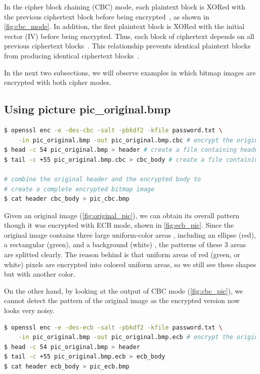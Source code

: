 In the cipher block chaining (CBC) mode, each plaintext block is XORed with
the previous ciphertext block before being encrypted~\cite{cipher_mode_wiki},
as shown in \autoref{fig:cbc_mode}.
In addition, the first plaintext block is XORed with the initial vector (IV)
before being encrypted. Thus, each block of ciphertext depends on all
previous ciphertext blocks~\cite{cipher_mode_wiki}. This relationship prevents
identical plaintext blocks from producing identical ciphertext blocks~\cite{ecb_cbc_example}.

In the next two subsections, we will observe examples in which bitmap images are
encrypted with both cipher modes.

\subsection{Using picture {\selectfont pic\_original.bmp}}
%
\begin{lstlisting}[language=Bash, caption=Commands generating
    {\fontfamily{qcr}\selectfont pic\_cbc.bmp}, label={lst:pic_cbc}]
$ openssl enc -e -des-cbc -salt -pbkdf2 -kfile password.txt \
    -in pic_original.bmp -out pic_original.bmp.cbc # encrypt the original picture
$ head -c 54 pic_original.bmp > header # create a file containing header of a bitmap image
$ tail -c +55 pic_original.bmp.cbc > cbc_body # create a file containing body of an encrypted image

# combine the original header and the encrypted body to
# create a complete encrypted bitmap image
$ cat header cbc_body > pic_cbc.bmp
\end{lstlisting}

Given an original image (\autoref{fig:original_pic}), we can obtain its
overall pattern though it was encrypted with ECB mode, shown in \autoref{fig:ecb_pic}.
Since the original image contains three large uniform-color areas
, including an ellipse (red), a rectangular (green), and a background (white)
, the patterns of these
3 areas are splitted clearly. The reason behind is that uniform areas of
red (green, or white) pixels are encrypted into colored uniform areas, so
we still see these shapes but with another color.

On the other hand, by looking at the output of CBC mode (\autoref{fig:cbc_pic}), we cannot
detect the pattern of the original image as the encrypted version now looks
very noisy.

\begin{lstlisting}[language=Bash, caption=Commands generating
    {\fontfamily{qcr}\selectfont pic\_ecb.bmp}, label={lst:pic_ecb}]
$ openssl enc -e -des-ecb -salt -pbkdf2 -kfile password.txt \
    -in pic_original.bmp -out pic_original.bmp.ecb # encrypt the original picture
$ head -c 54 pic_original.bmp > header
$ tail -c +55 pic_original.bmp.ecb > ecb_body
$ cat header ecb_body > pic_ecb.bmp
\end{lstlisting}

